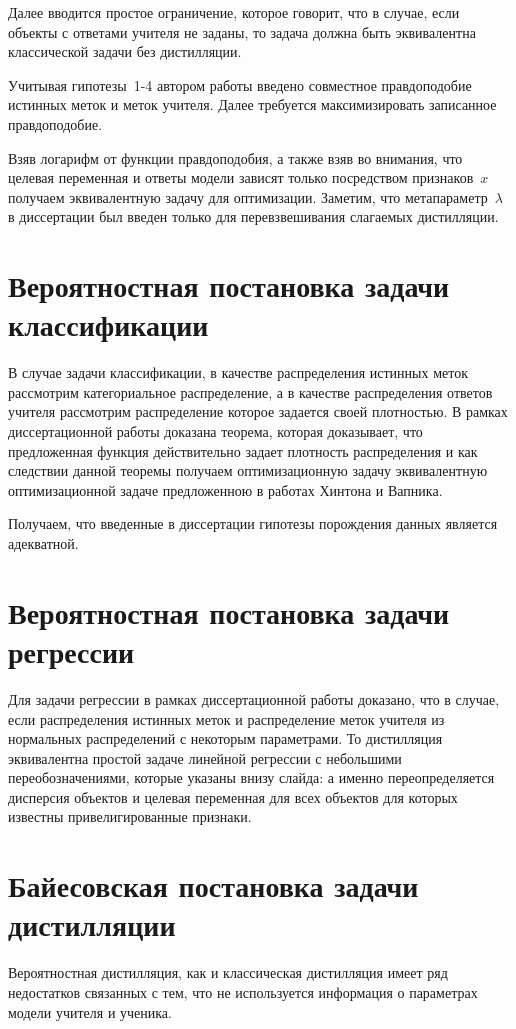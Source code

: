\documentclass[10pt, twoside]{article}
\begin{document}
Далее вводится простое ограничение, которое говорит, что в случае, если объекты с ответами учителя не заданы, то задача должна быть эквивалентна классической задачи без дистилляции.

Учитывая гипотезы~1-4 автором работы введено совместное правдоподобие истинных меток и меток учителя. Далее требуется максимизировать записанное правдоподобие. 

Взяв логарифм от функции правдоподобия, а также взяв во внимания, что целевая переменная и ответы модели зависят только посредством признаков~$x$ получаем эквивалентную задачу для оптимизации. Заметим, что метапараметр~$\lambda$ в диссертации был введен только для перевзвешивания слагаемых дистилляции.

\section{Вероятностная постановка задачи классификации}
В случае задачи классификации, в качестве распределения истинных меток рассмотрим категориальное распределение, а в качестве распределения ответов учителя рассмотрим распределение которое задается своей плотностью.
В рамках диссертационной работы доказана теорема, которая доказывает, что предложенная функция действительно задает плотность распределения и как следствии данной теоремы получаем оптимизационную задачу эквивалентную оптимизационной задаче предложенною в работах Хинтона и Вапника.

Получаем, что введенные в диссертации гипотезы порождения данных является адекватной.

\section{Вероятностная постановка задачи регрессии}

Для задачи регрессии в рамках диссертационной работы доказано, что в случае, если распределения истинных меток и распределение меток учителя из нормальных распределений с некоторым параметрами. То дистилляция эквивалентна простой задаче линейной регрессии с небольшими переобозначениями, которые указаны внизу слайда: а именно переопределяется дисперсия объектов и целевая переменная для всех объектов для которых известны привелигированные признаки.

\section{Байесовская постановка задачи дистилляции}
Вероятностная дистилляция, как и классическая дистилляция имеет ряд недостатков связанных с тем, что не используется информация о параметрах модели учителя и ученика.
\end{document}
